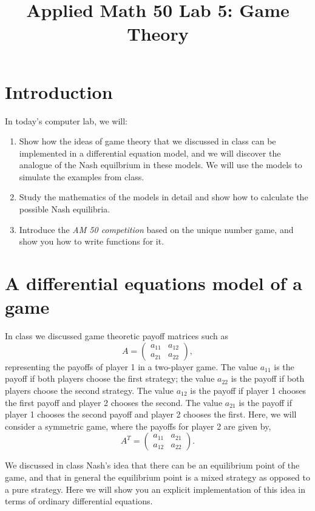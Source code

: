 \documentclass[12pt]{amsart}
\title{Applied Math 50 Lab 5: Game Theory
}
\date{}
\begin{document}
\maketitle

\section{Introduction}
In today's computer lab, we will:
\begin{enumerate}
 \item Show how the ideas of game theory that we discussed in class
    can be implemented in a differential equation model, and we will discover
    the analogue of the Nash equilbrium in these models. We will use the models
    to simulate the examples from class.
  \item Study the mathematics of the models in detail and show how to
    calculate the possible Nash equilibria.
  \item Introduce the \textit{AM 50 competition} based on the unique number
    game, and show you how to write functions for it.

\end{enumerate}

\section{A differential equations model of a game}
\noindent In class we discussed game theoretic payoff matrices such as
\[
A=\left( \begin{array}{cc}
a_{11} & a_{12} \\
a_{21} & a_{22} \end{array} \right),
\]
representing the payoffs of player 1 in a two-player game. The value $a_{11}$ is the
payoff if both players choose the first strategy; the value $a_{22}$ is the payoff
if both players choose the second strategy. The value $a_{12}$ is the payoff if
player 1 chooses the first payoff and player 2 chooses the second.   The value $a_{21}$ is the payoff if
player 1 chooses the second payoff and player 2 chooses the first.  Here, we
will consider a symmetric game, where the payoffs for player 2 are given by,
\[
A^T=\left( \begin{array}{cc}
a_{11} & a_{21} \\
a_{12} & a_{22} \end{array} \right).
\]

\noindent We discussed in class Nash's idea that there can be an equilibrium point
of the game, and that in general the equilibrium point is a mixed strategy as
opposed to a pure strategy. Here we will show you an explicit implementation of
this idea in terms of ordinary differential equations.\\
\end{document}
